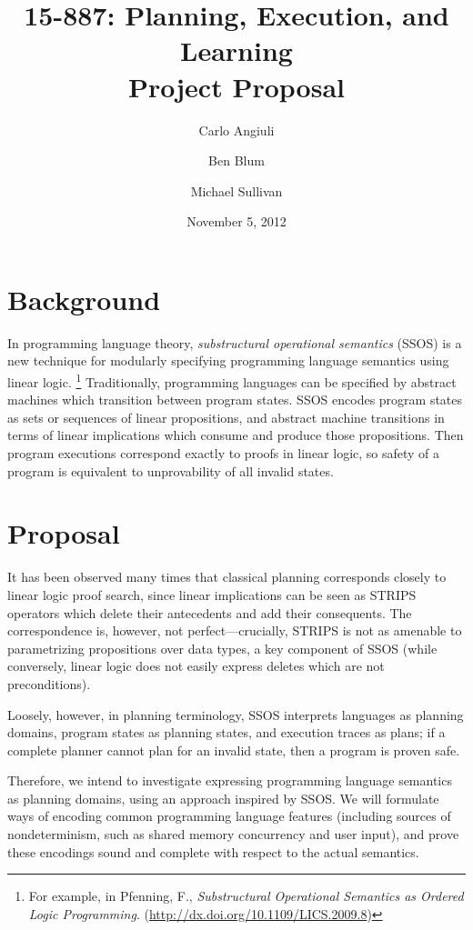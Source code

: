 \documentclass{article}
\title{
{\large 15-887: Planning, Execution, and Learning}\\
Project Proposal}
\author{Carlo Angiuli \and Ben Blum \and Michael Sullivan}
\date{November 5, 2012}
\begin{document}
\maketitle

\section{Background}

In programming language theory, \emph{substructural operational semantics}
(SSOS) is a new technique for modularly specifying programming language
semantics using linear logic.%
\footnote{For example, in Pfenning, F.,
\textit{Substructural Operational Semantics as Ordered Logic Programming}.
(\url{http://dx.doi.org/10.1109/LICS.2009.8})}
Traditionally, programming languages can be specified by abstract machines which
transition between program states. SSOS encodes program states as sets or
sequences of linear propositions, and abstract machine transitions in terms of
linear implications which consume and produce those propositions. Then program
executions correspond exactly to proofs in linear logic, so safety of a program
is equivalent to unprovability of all invalid states.

\section{Proposal}

It has been observed many times that classical planning corresponds closely to
linear logic proof search, since linear implications can be seen as STRIPS
operators which delete their antecedents and add their consequents. The
correspondence is, however, not perfect---crucially, STRIPS is not as amenable
to parametrizing propositions over data types, a key component of SSOS (while
conversely, linear logic does not easily express deletes which are not
preconditions).

Loosely, however, in planning terminology, SSOS interprets languages as planning
domains, program states as planning states, and execution traces as plans; if a
complete planner cannot plan for an invalid state, then a program is proven
safe.

Therefore, we intend to investigate expressing programming language semantics as
planning domains, using an approach inspired by SSOS. We will formulate ways of
encoding common programming language features (including sources of
nondeterminism, such as shared memory concurrency and user input), and prove
these encodings sound and complete with respect to the actual semantics.
\end{document}
